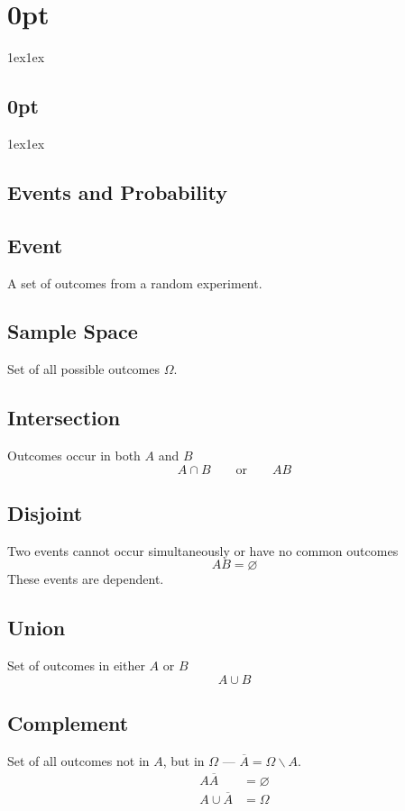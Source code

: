 \documentclass{article}
\begin{document}
\titlespacing*\section{0pt}{1ex}{1ex}
\titlespacing*\subsection{0pt}{1ex}{1ex}
%
\setlength\abovecaptionskip{-5pt}
\setlength\textfloatsep{0pt}
%
\setlength\abovedisplayskip{1pt}
\setlength\belowdisplayskip{1pt}

\begin{multicols}{3}
    \section{Events and Probability}
    \subsection{Event}
    A set of outcomes from a random experiment.
    \subsection{Sample Space}
    Set of all possible outcomes \(\Omega\).
    \subsection{Intersection}
    Outcomes occur in both \(A\) and \(B\)
    \begin{equation*}
        A \cap B \quad\quad \text{or} \quad\quad AB
    \end{equation*}
    \subsection{Disjoint}
    Two events cannot occur simultaneously or have no common outcomes
    \begin{equation*}
        AB = \varnothing
    \end{equation*}
    These events are dependent.
    \subsection{Union}
    Set of outcomes in either \(A\) or \(B\)
    \begin{equation*}
        A \cup B
    \end{equation*}
    \subsection{Complement}
    Set of all outcomes not in \(A\), but in \(\Omega\) --- \(\overline{A} = \Omega \backslash A\).
    \begin{align*}
        A\overline{A}       & = \varnothing \\
        A \cup \overline{A} & = \Omega
    \end{align*}

\end{multicols}
\end{document}
